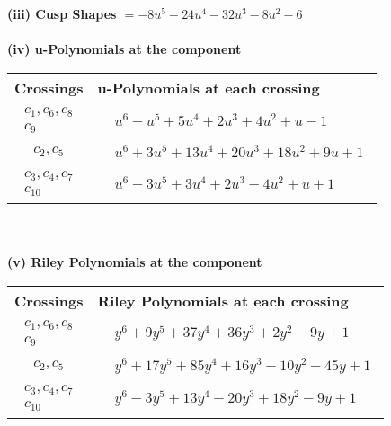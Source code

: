 \documentclass[1p]{elsarticle_modified}
\theoremstyle{definition}
\begin{document}
\flushleft \textbf{(iii) Cusp Shapes $= -8 u^5-24 u^4-32 u^3-8 u^2-6$}\\~\\
\newpage\renewcommand{\arraystretch}{1}
\flushleft \textbf{(iv) u-Polynomials at the component}\newline \\
\begin{tabular}{m{50pt}|m{274pt}}
Crossings & \hspace{64pt}u-Polynomials at each crossing \\
\hline $$\begin{aligned}c_{1},c_{6},c_{8}\\c_{9}\end{aligned}$$&$\begin{aligned}
&u^6- u^5+5 u^4+2 u^3+4 u^2+u-1
\end{aligned}$\\
\hline $$\begin{aligned}c_{2},c_{5}\end{aligned}$$&$\begin{aligned}
&u^6+3 u^5+13 u^4+20 u^3+18 u^2+9 u+1
\end{aligned}$\\
\hline $$\begin{aligned}c_{3},c_{4},c_{7}\\c_{10}\end{aligned}$$&$\begin{aligned}
&u^6-3 u^5+3 u^4+2 u^3-4 u^2+u+1
\end{aligned}$\\
\hline
\end{tabular}\\~\\
\newpage\renewcommand{\arraystretch}{1}
\flushleft \textbf{(v) Riley Polynomials at the component}\newline \\
\begin{tabular}{m{50pt}|m{274pt}}
Crossings & \hspace{64pt}Riley Polynomials at each crossing \\
\hline $$\begin{aligned}c_{1},c_{6},c_{8}\\c_{9}\end{aligned}$$&$\begin{aligned}
&y^6+9 y^5+37 y^4+36 y^3+2 y^2-9 y+1
\end{aligned}$\\
\hline $$\begin{aligned}c_{2},c_{5}\end{aligned}$$&$\begin{aligned}
&y^6+17 y^5+85 y^4+16 y^3-10 y^2-45 y+1
\end{aligned}$\\
\hline $$\begin{aligned}c_{3},c_{4},c_{7}\\c_{10}\end{aligned}$$&$\begin{aligned}
&y^6-3 y^5+13 y^4-20 y^3+18 y^2-9 y+1
\end{aligned}$\\
\hline
\end{tabular}\\~\\
\end{document}
